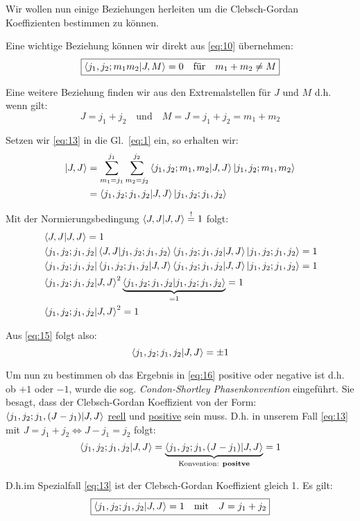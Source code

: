 \documentclass[12pt,a4paper,titlepage,oneside]{article}
\newcommand\bra[1]{\left\langle #1 \right|}
\newcommand\ket[1]{\left| #1 \right\rangle}
\newcommand\braket[2]{%
  \left\langle \vphantom{#2} #1%
    \middle|%
    \vphantom{#1} #2\right\rangle}%
\newcommand*\clap[1]{\hbox to 0pt{\hss#1\hss}}
\newcommand*\mathclap{\mathpalette\mathclapinternal}
\newcommand*\mathclapinternal[2]{\clap{$\mathsurround=0pt#1{#2}$}}
\def\underbr#1_#2{\underbrace{#1}_{\mathclap{#2}}}
\begin{document}
Wir wollen nun einige Beziehungen herleiten um die Clebsch-Gordan Koeffizienten
bestimmen zu können.

Eine wichtige Beziehung können wir direkt aus \eqref{eq:10} übernehmen:
\begin{equation}
  \label{eq:12}
  \boxed{\braket{j_1,j_2;m_1m_2}{J,M}=0 \quad \text{für} \quad m_1+m_2\neq M}
\end{equation}

Eine weitere Beziehung finden wir aus den Extremalstellen für \(J\) und \(M\)
d.h. wenn gilt:
\begin{equation}
  \label{eq:13}
  J=j_1+j_2 \quad \text{und} \quad M=J=j_1+j_2=m_1+m_2
\end{equation}

Setzen wir \eqref{eq:13} in die Gl.~\eqref{eq:1} ein, so erhalten wir:
\begin{align}
  \label{eq:14}
   \ket{J,J}&=\sum_{m_1=j_1}^{j_1}\sum_{m_2=j_2}^{j_2} 
   \braket{j_1,j_2;m_1,m_2}{J,J}
   \ket{j_1,j_2;m_1,m_2}\notag\\
   &= \braket{j_1,j_2;j_1,j_2}{J,J}
   \ket{j_1,j_2;j_1,j_2}
\end{align}

Mit der Normierungsbedingung \(\braket{J,J}{J,J}\stackrel{!}=1\) folgt:
\begin{align}
  \label{eq:15}
  &\braket{J,J}{J,J}=1\notag\\
  &\bra{j_1,j_2;j_1,j_2} \braket{J,J}{j_1,j_2;j_1,j_2}
  \braket{j_1,j_2;j_1,j_2}{J,J}\ket{j_1,j_2;j_1,j_2}=1\notag\\
  &\bra{j_1,j_2;j_1,j_2} \braket{j_1,j_2;j_1,j_2}{J,J}
  \braket{j_1,j_2;j_1,j_2}{J,J}\ket{j_1,j_2;j_1,j_2}=1\notag\\
  &\braket{j_1,j_2;j_1,j_2}{J,J}^2
  \underbrace{\braket{j_1,j_2;j_1,j_2}{j_1,j_2;j_1,j_2}}_{=1}=1\notag\\
  &\braket{j_1,j_2;j_1,j_2}{J,J}^2=1
\end{align}

Aus \eqref{eq:15} folgt also:
\begin{equation}
  \label{eq:16}
  \braket{j_1,j_2;j_1,j_2}{J,J}=\pm 1
\end{equation}

Um nun zu bestimmen ob das Ergebnis in \eqref{eq:16} positive oder negative ist
d.h. ob \(+1\) oder \(-1\), wurde die sog. \emph{Condon-Shortley
  Phasenkonvention} eingeführt. Sie besagt, dass der Clebsch-Gordan Koeffizient
von der Form:\\
\(\braket{j_1,j_2;j_1,(J-j_1)}{J,J}\) \underline{reell} und \underline{positive}
sein muss. D.h. in unserem Fall \eqref{eq:13} mit \(J=j_1+j_2 \Leftrightarrow
J-j_1=j_2\) folgt:
\begin{equation}
  \label{eq:17}
  \braket{j_1,j_2;j_1,j_2}{J,J}=\underbr{\braket{j_1,j_2;j_1,(J-j_1)}{J,J}}
  _{\text{Konvention: \textbf{positve}}}=1
\end{equation}

D.h.im Spezialfall \eqref{eq:13} ist der Clebsch-Gordan Koeffizient gleich 1. Es
gilt:
\begin{equation}
  \label{eq:18}
  \boxed{\braket{j_1,j_2;j_1,j_2}{J,J}=1 \quad \text{mit}\quad J=j_1+j_2}
\end{equation}
\end{document}
